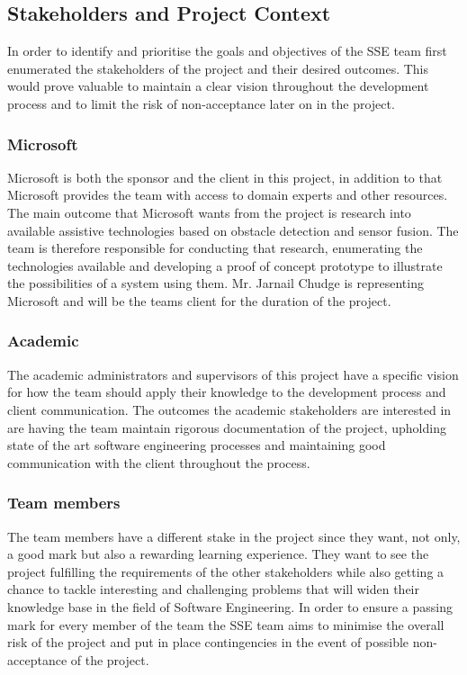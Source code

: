 \documentclass[prodmode,acmtosem]{acmsmall} %
\begin{document}
\subsection{Stakeholders and Project Context}
In order to identify and prioritise the goals and objectives of the SSE team first enumerated the stakeholders of the project and their desired outcomes. This would prove valuable to maintain a clear vision throughout the development process and to limit the risk of non-acceptance later on in the project.

\subsubsection{Microsoft}
Microsoft is both the sponsor and the client in this project, in addition to that Microsoft provides the team with access to domain experts and other resources. The main outcome that Microsoft wants from the project is research into available assistive technologies based on obstacle detection and sensor fusion. The team is therefore responsible for conducting that research, enumerating the technologies available and developing a proof of concept prototype to illustrate the possibilities of a system using them.
Mr. Jarnail Chudge is representing Microsoft and will be the teams client for the duration of the project.

\subsubsection{Academic}
The academic administrators and supervisors of this project have a specific vision for how the team should apply their knowledge to the development process and client communication.
The outcomes the academic stakeholders are interested in are having the team maintain rigorous documentation of the project, upholding state of the art software engineering processes and maintaining good communication with the client throughout the process.

\subsubsection{Team members}
The team members have a different stake in the project since they want, not only, a good mark but also a rewarding learning experience.
They want to see the project fulfilling the requirements of the other stakeholders while also getting a chance to tackle interesting and challenging problems that will widen their knowledge base in the field of Software Engineering.
In order to ensure a passing mark for every member of the team the SSE team aims to minimise the overall risk of the project and put in place contingencies in the event of possible non-acceptance of the project.
\end{document}
